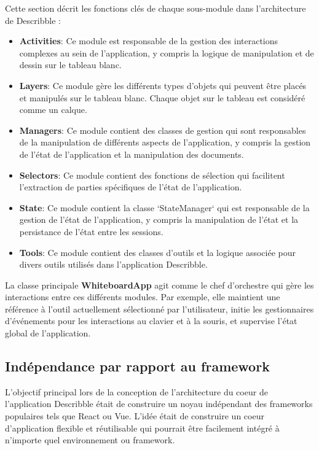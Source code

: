 Cette section décrit les fonctions clés de chaque sous-module dans l'architecture de \Gls{Describble} :

\begin{itemize}
    \item \textbf{Activities}: Ce module est responsable de la gestion des interactions complexes au sein de l'application, y compris la logique de manipulation et de dessin sur le tableau blanc.

    \item \textbf{Layers}: Ce module gère les différents types d'objets qui peuvent être placés et manipulés sur le tableau blanc. Chaque objet sur le tableau est considéré comme un calque.

    \item \textbf{Managers}: Ce module contient des classes de gestion qui sont responsables de la manipulation de différents aspects de l'application, y compris la gestion de l'état de l'application et la manipulation des documents.

    \item \textbf{Selectors}: Ce module contient des fonctions de sélection qui facilitent l'extraction de parties spécifiques de l'état de l'application.

    \item \textbf{State}: Ce module contient la classe `StateManager` qui est responsable de la gestion de l'état de l'application, y compris la manipulation de l'état et la persistance de l'état entre les sessions.

    \item \textbf{Tools}: Ce module contient des classes d'outils et la logique associée pour divers outils utilisés dans l'application \Gls{Describble}.
\end{itemize}

La classe principale \textbf{WhiteboardApp}  agit comme le chef d'orchestre qui gère les interactions entre ces différents modules. Par exemple, elle maintient une référence à l'outil actuellement sélectionné par l'utilisateur, initie les gestionnaires d'événements pour les interactions au clavier et à la souris, et supervise l'état global de l'application.

\subsection{Indépendance par rapport au framework}

L'objectif principal lors de la conception de l'architecture du coeur de l'application \Gls{Describble} était de construire un noyau indépendant des frameworks populaires tels que React ou Vue. L'idée était de construire un coeur d'application flexible et réutilisable qui pourrait être facilement intégré à n'importe quel environnement ou framework.


